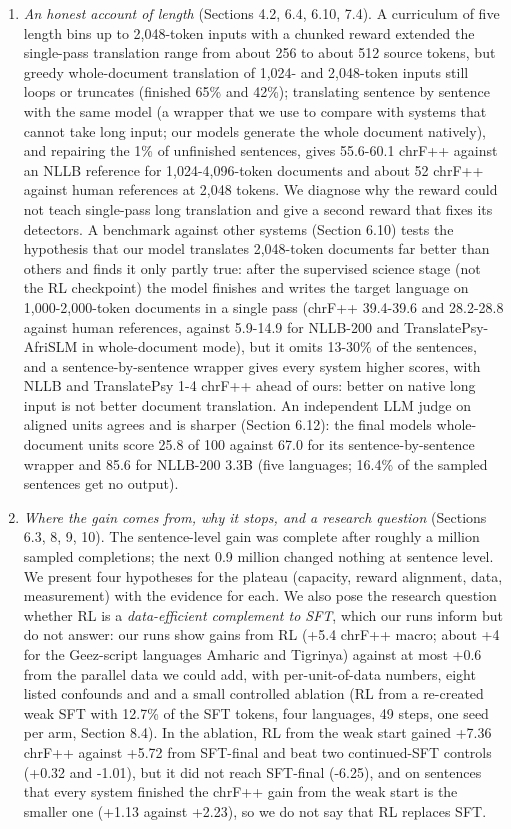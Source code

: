 \begin{enumerate}
\item
  \emph{An honest account of length} (Sections 4.2, 6.4, 6.10, 7.4). A curriculum of five length bins up to 2,048-token inputs with a chunked reward extended the single-pass translation range from about 256 to about 512 source tokens, but greedy whole-document translation of 1,024- and 2,048-token inputs still loops or truncates (finished 65\% and 42\%); translating sentence by sentence with the same model (a wrapper that we use to compare with systems that cannot take long input; our models generate the whole document natively), and repairing the 1\% of unfinished sentences, gives 55.6-60.1 chrF++ against an NLLB reference for 1,024-4,096-token documents and about 52 chrF++ against human references at 2,048 tokens. We diagnose why the reward could not teach single-pass long translation and give a second reward that fixes its detectors. A benchmark against other systems (Section 6.10) tests the hypothesis that our model translates 2,048-token documents far better than others and finds it only partly true: after the supervised science stage (not the RL checkpoint) the model finishes and writes the target language on 1,000-2,000-token documents in a single pass (chrF++ 39.4-39.6 and 28.2-28.8 against human references, against 5.9-14.9 for NLLB-200 and TranslatePsy-AfriSLM in whole-document mode), but it omits 13-30\% of the sentences, and a sentence-by-sentence wrapper gives every system higher scores, with NLLB and TranslatePsy 1-4 chrF++ ahead of ours: better on native long input is not better document translation. An independent LLM judge on aligned units agrees and is sharper (Section 6.12): the final model\textquotesingle s whole-document units score 25.8 of 100 against 67.0 for its sentence-by-sentence wrapper and 85.6 for NLLB-200 3.3B (five languages; 16.4\% of the sampled sentences get no output).
\item
  \emph{Where the gain comes from, why it stops, and a research question} (Sections 6.3, 8, 9, 10). The sentence-level gain was complete after roughly a million sampled completions; the next 0.9 million changed nothing at sentence level. We present four hypotheses for the plateau (capacity, reward alignment, data, measurement) with the evidence for each. We also pose the research question whether RL is a \emph{data-efficient complement to SFT}, which our runs inform but do not answer: our runs show gains from RL (+5.4 chrF++ macro; about +4 for the Ge\textquotesingle ez-script languages Amharic and Tigrinya) against at most +0.6 from the parallel data we could add, with per-unit-of-data numbers, eight listed confounds and and a small controlled ablation (RL from a re-created weak SFT with 12.7\% of the SFT tokens, four languages, 49 steps, one seed per arm, Section 8.4). In the ablation, RL from the weak start gained +7.36 chrF++ against +5.72 from SFT-final and beat two continued-SFT controls (+0.32 and -1.01), but it did not reach SFT-final (-6.25), and on sentences that every system finished the chrF++ gain from the weak start is the smaller one (+1.13 against +2.23), so we do not say that RL replaces SFT.

\end{enumerate}
